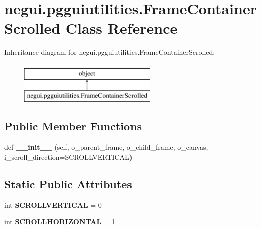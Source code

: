 \hypertarget{classnegui_1_1pgguiutilities_1_1FrameContainerScrolled}{}\section{negui.\+pgguiutilities.\+Frame\+Container\+Scrolled Class Reference}
\label{classnegui_1_1pgguiutilities_1_1FrameContainerScrolled}
Inheritance diagram for negui.\+pgguiutilities.\+Frame\+Container\+Scrolled\+:\begin{figure}[H]
\begin{center}
\leavevmode
\includegraphics[height=2.000000cm]{classnegui_1_1pgguiutilities_1_1FrameContainerScrolled}
\end{center}
\end{figure}
\subsection*{Public Member Functions}
\begin{DoxyCompactItemize}
\item 
def {\bfseries \+\_\+\+\_\+init\+\_\+\+\_\+} (self, o\+\_\+parent\+\_\+frame, o\+\_\+child\+\_\+frame, o\+\_\+canvas, i\+\_\+scroll\+\_\+direction=S\+C\+R\+O\+L\+L\+V\+E\+R\+T\+I\+C\+AL)\hypertarget{classnegui_1_1pgguiutilities_1_1FrameContainerScrolled_a6e6e85912ffe9db1e258483327c8c7bb}{}\label{classnegui_1_1pgguiutilities_1_1FrameContainerScrolled_a6e6e85912ffe9db1e258483327c8c7bb}

\end{DoxyCompactItemize}
\subsection*{Static Public Attributes}
\begin{DoxyCompactItemize}
\item 
int {\bfseries S\+C\+R\+O\+L\+L\+V\+E\+R\+T\+I\+C\+AL} = 0\hypertarget{classnegui_1_1pgguiutilities_1_1FrameContainerScrolled_ab9206d87d03f06b9ebfc7e93460aba30}{}\label{classnegui_1_1pgguiutilities_1_1FrameContainerScrolled_ab9206d87d03f06b9ebfc7e93460aba30}

\item 
int {\bfseries S\+C\+R\+O\+L\+L\+H\+O\+R\+I\+Z\+O\+N\+T\+AL} = 1\hypertarget{classnegui_1_1pgguiutilities_1_1FrameContainerScrolled_af674b82923a9232afeba8f2512727bbf}{}\label{classnegui_1_1pgguiutilities_1_1FrameContainerScrolled_af674b82923a9232afeba8f2512727bbf}

\end{DoxyCompactItemize}


